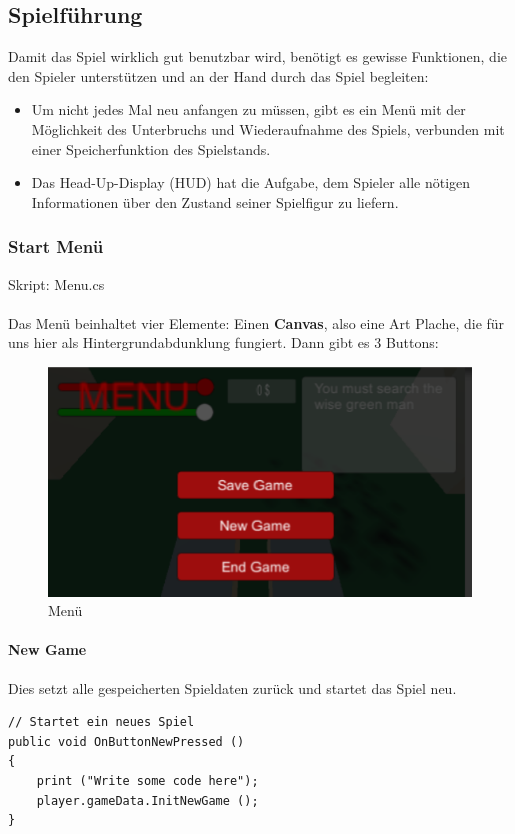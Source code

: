 \subsection{Spielführung}
Damit das Spiel wirklich gut benutzbar wird, benötigt es gewisse Funktionen, die den Spieler unterstützen und an der Hand durch das Spiel begleiten:
\begin{itemize}
\item Um nicht jedes Mal neu anfangen zu müssen, gibt es ein Menü mit der Möglichkeit des Unterbruchs und Wiederaufnahme des Spiels, verbunden mit einer Speicherfunktion des Spielstands.
\item Das Head-Up-Display (HUD) hat die Aufgabe, dem Spieler alle nötigen Informationen über den Zustand seiner Spielfigur zu liefern.
\end{itemize}

\subsubsection{Start Menü}
Skript: Menu.cs\\\\
Das Menü beinhaltet vier Elemente: Einen \textbf{Canvas}, also eine Art \glqq Plache\grqq, die für uns hier als Hintergrundabdunklung fungiert. Dann gibt es 3 Buttons:

\begin{figure}[H]
\includegraphics[scale=1]{screenshots/menuscreen.png}
\caption{Menü}
\end{figure}


\paragraph{New Game}
Dies setzt alle gespeicherten Spieldaten zurück und startet das Spiel neu.

\begin{lstlisting}[caption={New Game}]
// Startet ein neues Spiel
public void OnButtonNewPressed ()
{
	print ("Write some code here");
	player.gameData.InitNewGame ();
}

\end{lstlisting}

